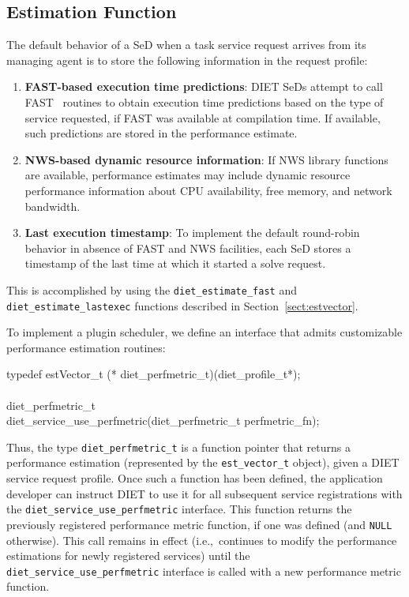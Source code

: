 \subsection{Estimation Function}\label{sect:est_fn}

The default behavior of a SeD when a task service request arrives from
its managing agent is to store the following information in the
request profile:
\begin{enumerate}
\item \textbf{FAST-based execution time predictions}: DIET SeDs
  attempt to call FAST~\cite{fast}
  routines to obtain execution time predictions based on the type of
  service requested, if FAST was available at compilation time.  If
  available, such predictions are stored in the
  performance estimate.
\item \textbf{NWS-based dynamic resource information}: If NWS library
  functions are available, performance estimates may include dynamic
  resource performance information about CPU availability, free
  memory, and network bandwidth.
\item \textbf{Last execution timestamp}: To implement the default
  round-robin behavior in absence of FAST and NWS facilities, each SeD
  stores a timestamp of the last time at which it started a solve
  request.
\end{enumerate}
This is accomplished by using the \texttt{diet\_estimate\_fast} and
\texttt{diet\_estimate\_lastexec} functions described in
Section~\ref{sect:estvector}.

To implement a plugin scheduler, we define an
interface that admits customizable performance estimation routines:
\begin{code}
  typedef estVector\_t (* diet\_perfmetric\_t)(diet\_profile\_t*);\\
  \\
  diet\_perfmetric\_t\\
  diet\_service\_use\_perfmetric(diet\_perfmetric\_t perfmetric\_fn);\\
\end{code}
Thus, the type \texttt{diet\_perfmetric\_t} is a function pointer
that returns a performance estimation (represented by the
\texttt{est\_vector\_t} object), given a DIET service request
profile.  Once such a function has been defined, the application
developer can instruct DIET to use it for all subsequent service
registrations with the
\texttt{diet\_service\_use\_perfmetric} interface.  This function
returns the previously registered performance metric function, if one
was defined (and
\texttt{NULL} otherwise).  This call remains in effect
(i.e.,~continues to modify the performance estimations for newly
registered services) until the
\texttt{diet\_service\_use\_perfmetric} interface is called with a new
performance metric function.


